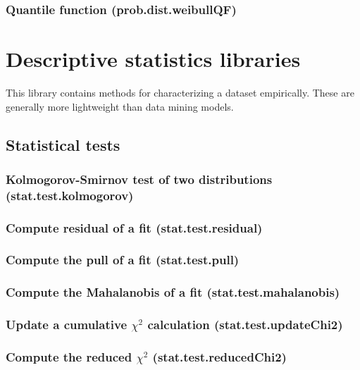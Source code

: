 \documentclass{article}
\theoremstyle{definition}
\begin{document}
\subsubsection{Quantile function (prob.dist.weibullQF)}

\pagebreak

\section{Descriptive statistics libraries}

This library contains methods for characterizing a dataset empirically.  These are generally more lightweight than data mining models.

\subsection{Statistical tests}

\subsubsection{Kolmogorov-Smirnov test of two distributions (stat.test.kolmogorov)}

\subsubsection{Compute residual of a fit (stat.test.residual)}

\subsubsection{Compute the pull of a fit (stat.test.pull)}

\subsubsection{Compute the Mahalanobis of a fit (stat.test.mahalanobis)}

\subsubsection{Update a cumulative $\chi^2$ calculation (stat.test.updateChi2)}

\subsubsection{Compute the reduced $\chi^2$ (stat.test.reducedChi2)}
\end{document}

